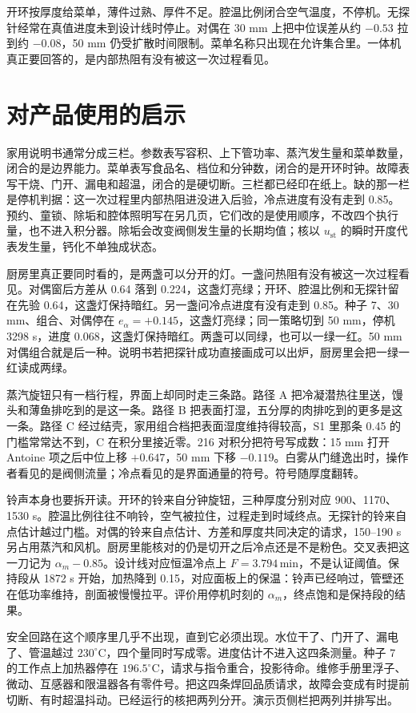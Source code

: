 开环按厚度给菜单，薄件过熟、厚件不足。腔温比例闭合空气温度，不停机。无探针经常在真值进度未到设计线时停止。对偶在 30 mm 上把中位误差从约 \(-0.53\) 拉到约 \(-0.08\)，50 mm 仍受扩散时间限制。菜单名称只出现在允许集合里。一体机真正要回答的，是内部热阻有没有被这一次过程看见。

\section{对产品使用的启示}

家用说明书通常分成三栏。参数表写容积、上下管功率、蒸汽发生量和菜单数量，闭合的是边界能力。菜单表写食品名、档位和分钟数，闭合的是开环时钟。故障表写干烧、门开、漏电和超温，闭合的是硬切断。三栏都已经印在纸上。缺的那一栏是停机判据：这一次过程里内部热阻进没进入后验，冷点进度有没有走到 0.85。预约、童锁、除垢和腔体照明写在另几页，它们改的是使用顺序，不改四个执行量，也不进入积分器。除垢会改变阀侧发生量的长期均值；核以 \(u_{\mathrm{st}}\) 的瞬时开度代表发生量，钙化不单独成状态。

厨房里真正要同时看的，是两盏可以分开的灯。一盏问热阻有没有被这一次过程看见。对偶窗后方差从 0.64 落到 0.224，这盏灯亮绿；开环、腔温比例和无探针留在先验 0.64，这盏灯保持暗红。另一盏问冷点进度有没有走到 0.85。种子 7、30 mm、组合、对偶停在 \(e_{\alpha}=+0.145\)，这盏灯亮绿；同一策略切到 50 mm，停机 3298 s，进度 0.068，这盏灯保持暗红。两盏可以同绿，也可以一绿一红。50 mm 对偶组合就是后一种。说明书若把探针成功直接画成可以出炉，厨房里会把一绿一红读成两绿。

蒸汽旋钮只有一档行程，界面上却同时走三条路。路径 A 把冷凝潜热往里送，馒头和薄鱼排吃到的是这一条。路径 B 把表面打湿，五分厚的肉排吃到的更多是这一条。路径 C 经过结壳，家用组合档把表面湿度维持得较高，S1 里那条 0.45 的门槛常常达不到，C 在积分里接近零。216 对积分把符号写成数：15 mm 打开 Antoine 项之后中位上移 \(+0.647\)，50 mm 下移 \(-0.119\)。白雾从门缝逸出时，操作者看见的是阀侧流量；冷点看见的是界面通量的符号。符号随厚度翻转。

铃声本身也要拆开读。开环的铃来自分钟旋钮，三种厚度分别对应 900、1170、1530 s。腔温比例往往不响铃，空气被拉住，过程走到时域终点。无探针的铃来自点估计越过门槛。对偶的铃来自点估计、方差和厚度共同决定的请求，150--190 s 另占用蒸汽和风机。厨房里能核对的仍是切开之后冷点还是不是粉色。交叉表把这一刀记为 \(\alpha_m-0.85\)。设计线对应恒温冷点上 \(F=3.794\,\mathrm{min}\)，不是认证阈值。保持段从 1872 s 开始，加热降到 0.15，对应面板上的保温：铃声已经响过，管壁还在低功率维持，剖面被慢慢拉平。评价用停机时刻的 \(\alpha_m\)，终点饱和是保持段的结果。

安全回路在这个顺序里几乎不出现，直到它必须出现。水位干了、门开了、漏电了、管温越过 \(230^\circ\mathrm{C}\)，四个量同时写成零。进度估计不进入这四条测量。种子 7 的工作点上加热器停在 \(196.5^\circ\mathrm{C}\)，请求与指令重合，投影待命。维修手册里浮子、微动、互感器和限温器各有零件号。把这四条焊回品质请求，故障会变成有时提前切断、有时超温抖动。已经运行的核把两列分开。演示页侧栏把两列并排写出。

